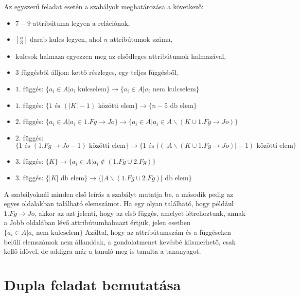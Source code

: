 Az egyszerű feladat esetén a szabályok meghatározása a következő:
\begin{itemize}
    \item $7-9$ attribútuma legyen a relációnak,
    \item $\floor*{\frac{n}{3}}$ darab kulcs legyen, ahol $n$ attribútumok száma,
    \item kulcsok halmaza egyezzen meg az elsődleges attribútumok halmazával,
    \item $3$ függésből álljon: kettő részleges, egy teljes függésből,
    \item $1.$ függés: $\big\{ a_i \in A \big| a_i \text{ kulcselem}  \big\} \longrightarrow \big\{  a_i \in A \big| a_i \text{ nem kulcselem}  \big\}$ 
    \item $1. $ függés: $\big \{ 1 \text{ és } (|K|-1) \text{ közötti elem} \big\} \longrightarrow \big\{ n-5 \text{ db elem} \big \}$
    \item $2.$ függés: $\big\{ a_i \in A \big| a_i \in 1.Fg \rightarrow Jo  \big\} \longrightarrow \big\{  a_i \in A \big| a_i \in A \backslash (K \cup 1.Fg \rightarrow Jo)  \big\}$ 
    \item $2. $ függés: $\big \{ 1 \text{ és } (1.Fg\rightarrow Jo - 1) \text{ közötti elem} \big\} \longrightarrow \big\{ 1 \text { és } ( (|A \backslash (K \cup 1.Fg \rightarrow Jo)| - 1)  \text{ közötti elem} \big \}$
    \item $3.$ függés: $\big\{ K \big\} \longrightarrow \big\{  a_i \in A \big| a_i \not\in (1.Fg \cup 2.Fg)  \big\}$ 
    \item $3. $ függés: $\big \{ |K| \text{ db elem} \big\} \longrightarrow \big\{|A \backslash (1.Fg \cup 2.Fg)| \text{ db elem} \big \}$
\end{itemize}
A szabályoknál minden első leírás a szabályt mutatja be, a második pedig az egyes oldalakban található elemszámot. Ha egy olyan található, hogy például $1.Fg \rightarrow Jo$, akkor az azt jelenti, hogy az első függés, amelyet létrehoztunk, annak a Jobb oldalában lévő attribútumhalmazt értjük, jelen esetben $\big\{  a_i \in A \big| a_i \text{ nem kulcselem}  \big\}$
Azáltal, hogy az attribútumszám és a függéseken belüli elemszámok nem állandóak, a gondolatmenet kevésbé kiismerhető, csak kellő idővel, de addigra már a tanuló meg is tanulta a tananyagot. 

\section{Dupla feladat bemutatása}

